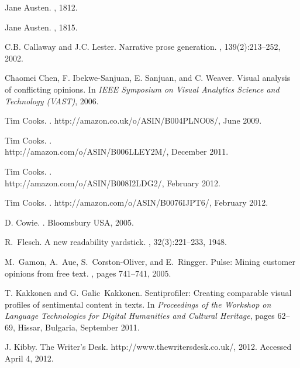 \documentclass{article}
\begin{document}
\begin{thebibliography}{10}

Jane Austen.
, 1812.

Jane Austen.
, 1815.

C.B. Callaway and J.C. Lester.
\newblock Narrative prose generation.
, 139(2):213--252, 2002.

Chaomei Chen, F. Ibekwe-Sanjuan, E. Sanjuan, and C. Weaver.
\newblock Visual analysis of conflicting opinions.
\newblock In {\em IEEE Symposium on Visual Analytics Science and Technology
  (VAST)}, 2006.

Tim Cooks.
.
\newblock http://amazon.co.uk/o/ASIN/B004PLNO08/, June 2009.

Tim Cooks.
. \\
\newblock http://amazon.com/o/ASIN/B006LLEY2M/, December 2011.

Tim Cooks.
. \\
\newblock http://amazon.com/o/ASIN/B008I2LDG2/, February 2012.

Tim Cooks.
.
\newblock http://amazon.com/o/ASIN/B0076IJPT6/, February 2012.

D. Cowie.
.
\newblock Bloomsbury USA, 2005.

R.~Flesch.
\newblock A new readability yardstick.
, 32(3):221--233, 1948.

M.~Gamon, A.~Aue, S.~Corston-Oliver, and E.~Ringger.
\newblock Pulse: Mining customer opinions from free text.
, pages 741--741, 2005.

T. Kakkonen and G. Galic~Kakkonen.
\newblock Sentiprofiler: Creating comparable visual profiles of sentimental
  content in texts.
\newblock In {\em Proceedings of the Workshop on Language Technologies for
  Digital Humanities and Cultural Heritage}, pages 62--69, Hissar, Bulgaria,
  September 2011.

J. Kibby.
\newblock The {W}riter's {D}esk.
\newblock http://www.thewritersdesk.co.uk/, 2012.
\newblock Accessed April 4, 2012.


\end{thebibliography}
\end{document}

